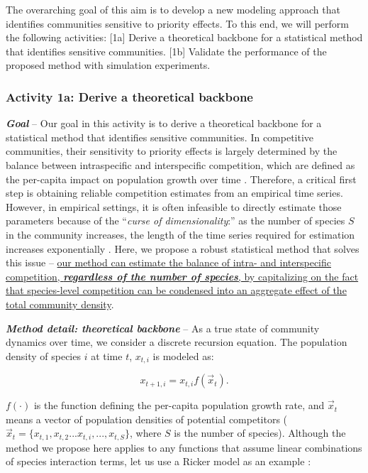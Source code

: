 \documentclass[12pt, class=article, crop=false]{standalone}
\begin{document}
The overarching goal of this aim is to develop a new modeling approach that identifies communities sensitive to priority effects.
To this end, we will perform the following activities:
[1a] Derive a theoretical backbone for a statistical method that identifies sensitive communities.
[1b] Validate the performance of the proposed method with simulation experiments.

\subsubsection*{Activity 1a: Derive a theoretical backbone}

\textbf{\textit{Goal}} -- 
Our goal in this activity is to derive a theoretical backbone for a statistical method that identifies sensitive communities.
In competitive communities, their sensitivity to priority effects is largely determined by the balance between intraspecific and interspecific competition, which are defined as the per-capita impact on population growth over time \citep{chesson_mechanisms_2000, barabas_chessons_2018, ke_coexistence_2018, terui_intentional_2023}.
Therefore, a critical first step is obtaining reliable competition estimates from an empirical time series.
However, in empirical settings, it is often infeasible to directly estimate those parameters because of the ``\textit{curse of dimensionality}:'' as the number of species $S$ in the community increases, the length of the time series required for estimation increases exponentially \citep{ovaskainen_how_2017}.
Here, we propose a robust statistical method that solves this issue -- \ul{our method can estimate the balance of intra- and interspecific competition, \textbf{\textit{regardless of the number of species}}, by capitalizing on the fact that species-level competition can be condensed into an aggregate effect of the total community density}.

\textbf{\textit{Method detail: theoretical backbone}} -- 
As a true state of community dynamics over time, we consider a discrete recursion equation. The population density of species $i$ at time $t$, $x_{t,i}$ is modeled as:

\begin{equation}
\label{eq:m0}
x_{t + 1, i} = x_{t, i} f(\overset{\rightarrow}{x}_{t}).
\end{equation}

$f(\cdot)$ is the function defining the per-capita population growth rate, and $\overset{\rightarrow}{x}_{t}$ means a vector of population densities of potential competitors ($\overset{\rightarrow}{x}_{t} = \{x_{t,1}, x_{t,2}...x_{t,i},...,x_{t,S}\}$, where $S$ is the number of species).
Although the method we propose here applies to any functions that assume linear combinations of species interaction terms, let us use a Ricker model as an example \citep{ricker_stock_1954, fowler_species_2012, terui_intentional_2023}:
\end{document}
